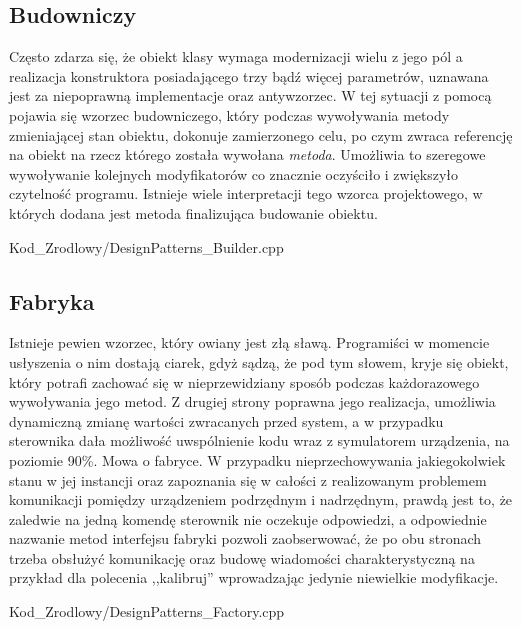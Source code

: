     \subsection{Budowniczy}
        Często zdarza się, że obiekt klasy wymaga modernizacji wielu z jego pól a realizacja konstruktora posiadającego trzy bądź więcej parametrów,
        uznawana jest za niepoprawną implementacje oraz antywzorzec. W tej sytuacji z pomocą pojawia się wzorzec budowniczego, który podczas wywoływania metody 
        zmieniającej stan obiektu, dokonuje zamierzonego celu, po czym zwraca referencję na obiekt na rzecz którego została wywołana \textit{metoda}. 
        Umożliwia to szeregowe wywoływanie kolejnych modyfikatorów co znacznie oczyściło i zwiększyło czytelność programu. Istnieje wiele interpretacji tego wzorca projektowego,
        w których dodana jest metoda finalizująca budowanie obiektu.
        
            {Kod_Zrodlowy/DesignPatterns_Builder.cpp}
\newpage
    \subsection{Fabryka}
        Istnieje pewien wzorzec, który owiany jest złą sławą. Programiści w momencie usłyszenia o nim dostają ciarek, gdyż sądzą, że pod tym słowem,
        kryje się obiekt, który potrafi zachować się w nieprzewidziany sposób podczas każdorazowego wywoływania jego metod. Z drugiej strony poprawna jego realizacja, 
        umożliwia dynamiczną zmianę wartości zwracanych przed system, a w przypadku sterownika dała możliwość uwspólnienie kodu wraz z symulatorem urządzenia,
        na poziomie 90\%. Mowa o fabryce. W przypadku nieprzechowywania jakiegokolwiek stanu w jej instancji oraz zapoznania się w całości z realizowanym problemem
        komunikacji pomiędzy urządzeniem podrzędnym i nadrzędnym, prawdą jest to, że zaledwie na jedną komendę sterownik nie oczekuje odpowiedzi, a odpowiednie
        nazwanie metod interfejsu fabryki pozwoli zaobserwować, że po obu stronach trzeba obsłużyć komunikację oraz budowę wiadomości charakterystyczną na przykład
        dla polecenia ,,kalibruj'' wprowadzając jedynie niewielkie modyfikacje. 
        
        {Kod_Zrodlowy/DesignPatterns_Factory.cpp}
